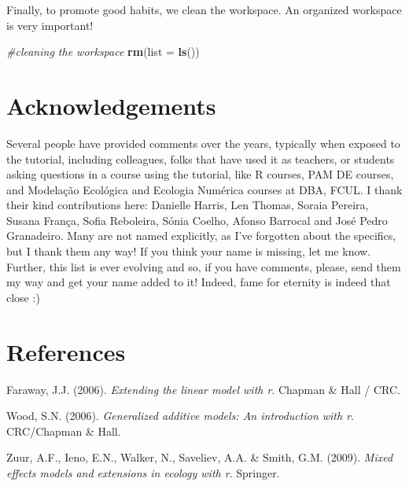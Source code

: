 \documentclass[
]{article}
\newenvironment{Shaded}{\begin{snugshade}}{\end{snugshade}}
\newcommand{\AttributeTok}[1]{\textcolor[rgb]{0.13,0.29,0.53}{#1}}
\newcommand{\CommentTok}[1]{\textcolor[rgb]{0.56,0.35,0.01}{\textit{#1}}}
\newcommand{\FunctionTok}[1]{\textcolor[rgb]{0.13,0.29,0.53}{\textbf{#1}}}
\newcommand{\NormalTok}[1]{#1}
\newlength{\cslhangindent}
\newenvironment{CSLReferences}[2] %
 {\begin{list}{}{%
  \setlength{\itemindent}{0pt}
  \setlength{\leftmargin}{0pt}
  \setlength{\parsep}{0pt}
  \ifodd #1
   \setlength{\leftmargin}{\cslhangindent}
   \setlength{\itemindent}{-1\cslhangindent}
  \fi
  \setlength{\itemsep}{#2\baselineskip}}}
 {\end{list}}
\begin{document}
Finally, to promote good habits, we clean the workspace. An organized
workspace is very important!

\begin{Shaded}
\begin{Highlighting}[]
\CommentTok{\#cleaning the workspace}
\FunctionTok{rm}\NormalTok{(}\AttributeTok{list =} \FunctionTok{ls}\NormalTok{())}
\end{Highlighting}
\end{Shaded}

\section{Acknowledgements}\label{acknowledgements}

Several people have provided comments over the years, typically when
exposed to the tutorial, including colleagues, folks that have used it
as teachers, or students asking questions in a course using the
tutorial, like R courses, PAM DE courses, and Modelação Ecológica and
Ecologia Numérica courses at DBA, FCUL. I thank their kind contributions
here: Danielle Harris, Len Thomas, Soraia Pereira, Susana França, Sofia
Reboleira, Sónia Coelho, Afonso Barrocal and José Pedro Granadeiro. Many
are not named explicitly, as I've forgotten about the specifics, but I
thank them any way! If you think your name is missing, let me know.
Further, this list is ever evolving and so, if you have comments,
please, send them my way and get your name added to it! Indeed, fame for
eternity is indeed that close :)

\section*{References}\label{references}

\label{refs}
\begin{CSLReferences}{1}{1}
Faraway, J.J. (2006). \emph{Extending the linear model with r}. Chapman
\& Hall / CRC.

Wood, S.N. (2006). \emph{Generalized additive models: An introduction
with r}. CRC/Chapman \& Hall.

Zuur, A.F., Ieno, E.N., Walker, N., Saveliev, A.A. \& Smith, G.M.
(2009). \emph{Mixed effects models and extensions in ecology with r}.
Springer.

\end{CSLReferences}
\end{document}

